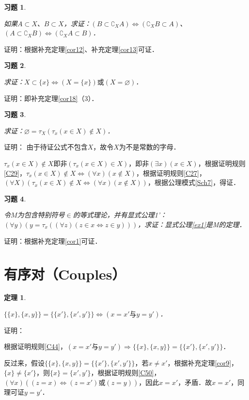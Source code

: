 \documentclass[12pt, a4paper, oneside]{book}
\newtheorem{theo}{定理}
\newtheorem{exer}{习题}
\begin{document}
			\begin{exer}\label{exer38}
				\hfill\par
					如果$A\subset X$、$B\subset X$，求证：$(B\subset \complement_XA)\Leftrightarrow (\complement_XB\subset A)$、$(A\subset \complement_XB)\Leftrightarrow (\complement_XA\subset B)$．
			\end{exer}
			证明：根据补充定理\ref{cor12}、补充定理\ref{cor13}可证．

			\begin{exer}\label{exer39}
				\hfill\par
				求证：$X\subset \{x\}\Leftrightarrow (X=\{x\})\text{或}(X= \varnothing)$．
			\end{exer}
			证明：即补充定理\ref{cor18}（3）．

			\begin{exer}\label{exer40}
				\hfill\par
				求证：$\varnothing=\tau_X(\tau_x(x\in X)\notin X)$．
			\end{exer}
			证明：
			由于待证公式不包含$X$，故令$X$为不是常数的字母．
			\par
			$\tau_x(x\in X)\notin X即\text{非}(\tau_x(x\in X)\in X)$，即$\text{非}(\exists x)(x\in X)$，根据证明规则\ref{C29}，$\tau_x(x\in X)\notin X\Leftrightarrow (\forall x)(x\notin X)$，根据证明规则\ref{C27}，$(\forall X)(\tau_x(x\in X)\notin X\Leftrightarrow (\forall x)(x\notin X))$，根据公理模式\ref{Sch7}，得证．			
			
			\begin{exer}\label{exer41}
				\hfill\par
				令$M$为包含特别符号$\in$的等式理论，并有显式公理1'：$(\forall y)(y=\tau_x((\forall z)(z\in x\Leftrightarrow z\in y)))$，求证：显式公理\ref{ex1}是M的定理．
			\end{exer}
			证明：根据补充定理\ref{cor1}可证．			

		\section{有序对（Couples）}
			\begin{theo}\label{theo7}
				\hfill\par
				$\{\{x\},\{x, y\}\}=\{\{x'\},\{x', y'\}\}\Leftrightarrow (x=x'\text{与}y=y')$．
			\end{theo}
			证明：
			\par
			根据证明规则\ref{C44}，$(x=x'\text{与}y=y')\Rightarrow \{\{x\},\{x, y\}\}=\{\{x'\},\{x', y'\}\}$．
			\par
			反过来，假设$\{\{x\},\{x, y\}\}=\{\{x'\},\{x', y'\}\}$，若$x\neq x'$，根据补充定理\ref{cor9}，$\{x\}\neq \{x'\}$，则$\{x\}=\{x', y'\}$，根据证明规则\ref{C50}，$(\forall x)((z=x)\Leftrightarrow (z=x')\text{或}(z=y))$，因此$x=x'$，矛盾．故$x=x'$，同理可证$y=y'$．
\end{document}
